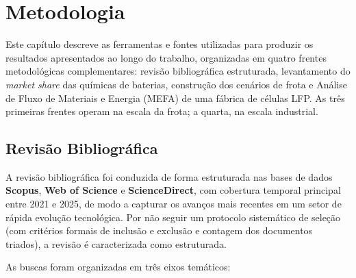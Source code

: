 \newpage
\section{Metodologia}
\label{sec:metodologia}

Este capítulo descreve as ferramentas e fontes utilizadas para produzir os
resultados apresentados ao longo do trabalho, organizadas em quatro frentes
metodológicas complementares: revisão bibliográfica estruturada, levantamento do
\textit{market share} das químicas de baterias, construção dos cenários de frota
e Análise de Fluxo de Materiais e Energia (MEFA) de uma fábrica de células LFP.
As três primeiras frentes operam na escala da frota; a quarta, na escala
industrial.

\subsection{Revisão Bibliográfica}
\label{sec:met-revisao}

A revisão bibliográfica foi conduzida de forma estruturada nas bases de dados
\textbf{Scopus}, \textbf{Web of Science} e \textbf{ScienceDirect}, com cobertura
temporal principal entre 2021 e 2025, de modo a capturar os avanços mais recentes
em um setor de rápida evolução tecnológica. Por não seguir um protocolo
sistemático de seleção (com critérios formais de inclusão e exclusão e
contagem dos documentos triados), a revisão é caracterizada como estruturada.

As buscas foram organizadas em três eixos temáticos:

